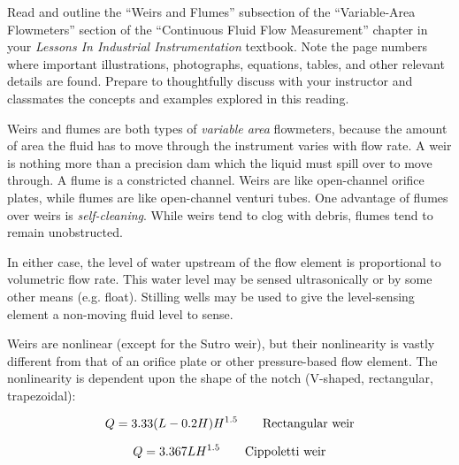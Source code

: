 

Read and outline the ``Weirs and Flumes'' subsection of the ``Variable-Area Flowmeters'' section of the ``Continuous Fluid Flow Measurement'' chapter in your {\it Lessons In Industrial Instrumentation} textbook.  Note the page numbers where important illustrations, photographs, equations, tables, and other relevant details are found.  Prepare to thoughtfully discuss with your instructor and classmates the concepts and examples explored in this reading.














Weirs and flumes are both types of {\it variable area} flowmeters, because the amount of area the fluid has to move through the instrument varies with flow rate.  A weir is nothing more than a precision dam which the liquid must spill over to move through.  A flume is a constricted channel.  Weirs are like open-channel orifice plates, while flumes are like open-channel venturi tubes.  One advantage of flumes over weirs is {\it self-cleaning}.  While weirs tend to clog with debris, flumes tend to remain unobstructed.

\vskip 10pt

In either case, the level of water upstream of the flow element is proportional to volumetric flow rate.  This water level may be sensed ultrasonically or by some other means (e.g. float).  Stilling wells may be used to give the level-sensing element a non-moving fluid level to sense.

\vskip 10pt

Weirs are nonlinear (except for the Sutro weir), but their nonlinearity is vastly different from that of an orifice plate or other pressure-based flow element.  The nonlinearity is dependent upon the shape of the notch (V-shaped, rectangular, trapezoidal):

$$Q = 3.33 (L - 0.2H) H^{1.5} \hbox{\hskip 20pt Rectangular weir}$$

$$Q = 3.367 L H^{1.5} \hbox{\hskip 20pt Cippoletti weir}$$


